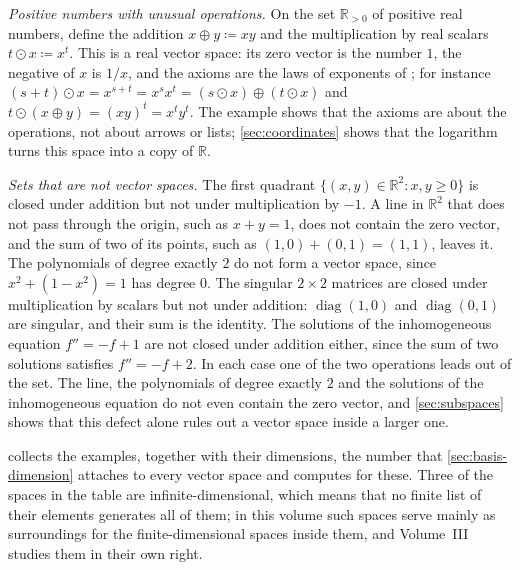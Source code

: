 \emph{Positive numbers with unusual operations.} On the set $\mathbb R_{>0}$ of positive real numbers, define the addition $x\oplus y\coloneqq xy$ and the multiplication by real scalars $t\odot x\coloneqq x^t$. This is a real vector space: its zero vector is the number $1$, the negative of $x$ is $1/x$, and the axioms are the laws of exponents of ; for instance $(s+t)\odot x=x^{s+t}=x^sx^t=(s\odot x)\oplus(t\odot x)$ and $t\odot(x\oplus y)=(xy)^t=x^ty^t$. The example shows that the axioms are about the operations, not about arrows or lists; \cref{sec:coordinates} shows that the logarithm turns this space into a copy of $\mathbb R$.

\emph{Sets that are not vector spaces.} The first quadrant $\{(x,y)\in\mathbb R^2: x,y\ge0\}$ is closed under addition but not under multiplication by $-1$. A line in $\mathbb R^2$ that does not pass through the origin, such as $x+y=1$, does not contain the zero vector, and the sum of two of its points, such as $(1,0)+(0,1)=(1,1)$, leaves it. The polynomials of degree exactly $2$ do not form a vector space, since $x^2+(1-x^2)=1$ has degree $0$. The singular $2\times2$ matrices are closed under multiplication by scalars but not under addition: $\operatorname{diag}(1,0)$ and $\operatorname{diag}(0,1)$ are singular, and their sum is the identity. The solutions of the inhomogeneous equation $f''=-f+1$ are not closed under addition either, since the sum of two solutions satisfies $f''=-f+2$. In each case one of the two operations leads out of the set. The line, the polynomials of degree exactly $2$ and the solutions of the inhomogeneous equation do not even contain the zero vector, and \cref{sec:subspaces} shows that this defect alone rules out a vector space inside a larger one.

 collects the examples, together with their dimensions, the number that \cref{sec:basis-dimension} attaches to every vector space and computes for these. Three of the spaces in the table are infinite-dimensional, which means that no finite list of their elements generates all of them; in this volume such spaces serve mainly as surroundings for the finite-dimensional spaces inside them, and Volume~III studies them in their own right.


